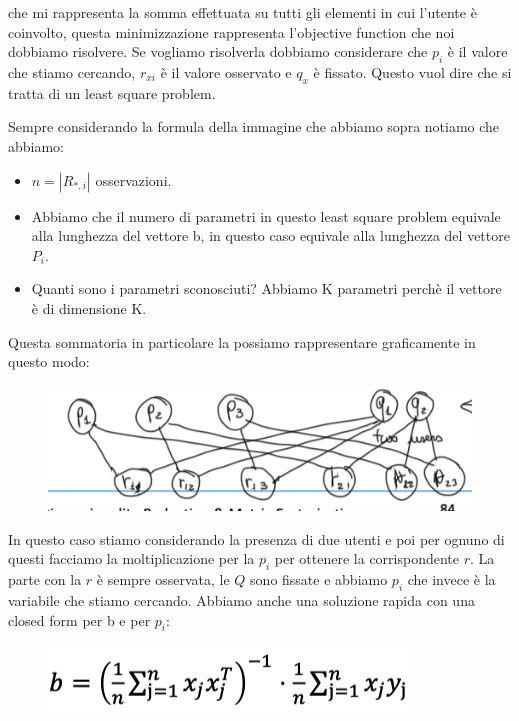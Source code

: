 \documentclass[14pt]{extreport}
\begin{document}
che mi rappresenta la somma effettuata su tutti gli elementi in cui l'utente è coinvolto, questa minimizzazione rappresenta l'objective function che 
noi dobbiamo risolvere.
Se vogliamo risolverla dobbiamo considerare che $p_i$ è il valore che stiamo cercando, $r_{xi}$ è il valore osservato e $q_x$ è fissato.
Questo vuol dire che si tratta di un least square problem.

Sempre considerando la formula della immagine che abbiamo sopra notiamo che abbiamo:

\begin{itemize}
	\item $n = |R_{*,i}|$ osservazioni.
	\item Abbiamo che il numero di parametri in questo least square problem equivale alla lunghezza del vettore b, in questo caso equivale alla lunghezza 
	del vettore $P_i$.
	\item Quanti sono i parametri sconosciuti? Abbiamo K parametri perchè il vettore è di dimensione K.
\end{itemize}

Questa sommatoria in particolare la possiamo rappresentare graficamente in questo modo:


\begin{figure}[H] 
\centering
\includegraphics[width=0.7\linewidth]{520.jpeg}
\end{figure}

In questo caso stiamo considerando la presenza di due utenti e poi per ognuno di questi facciamo la moltiplicazione per la $p_i$ per ottenere la corrispondente $r$.
La parte con la $r$ è sempre osservata, le $Q$ sono fissate e abbiamo $p_i$ che invece è la variabile che stiamo cercando.
Abbiamo anche una soluzione rapida con una closed form per b e per $p_i$:

\begin{figure}[H] 
\centering
\includegraphics[width=0.7\linewidth]{521.jpeg}
\end{figure}
\end{document}
